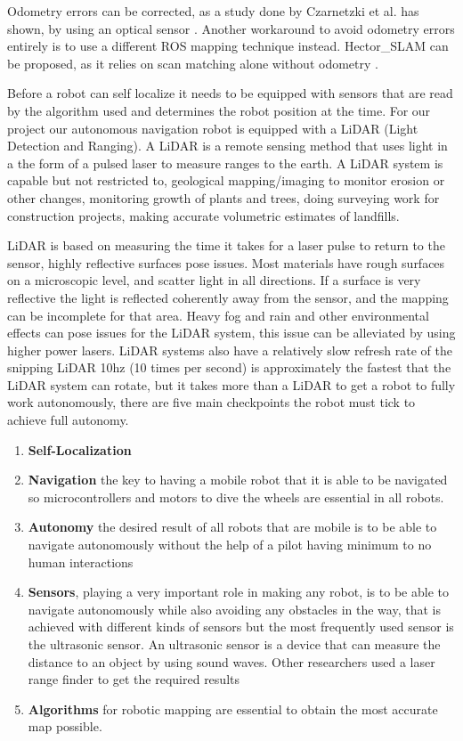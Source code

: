 \documentclass[12pt]{report}
\begin{document}
\vspace{1em}
Odometry errors can be corrected, as a study done by Czarnetzki et al. has shown, by using an optical sensor \cite{Czarnetzki}. Another workaround to avoid odometry errors entirely is to use a different ROS mapping technique instead. Hector\_SLAM can be proposed, as it relies on scan matching alone without odometry \cite{Kamarudin}.\par
\vspace{1em}
Before a robot can self localize it needs to be equipped with sensors that are read by the algorithm used and determines the robot position at the time. For our project our autonomous navigation robot is equipped with a LiDAR (Light Detection and Ranging). A LiDAR is a remote sensing method that uses light in a the form of a pulsed laser to measure ranges to the earth. A LiDAR system is capable but not restricted to, geological mapping/imaging to monitor erosion or other changes, monitoring growth of plants and trees, doing surveying work for construction projects, making accurate volumetric estimates of landfills.\par
\vspace{1em}
LiDAR is based on measuring the time it takes for a laser pulse to return to the sensor, highly reflective surfaces pose issues. Most materials have rough surfaces on a microscopic level, and scatter light in all directions. If a surface is very reflective the light is reflected coherently away from the sensor, and the mapping can be incomplete for that area. Heavy fog and rain and other environmental effects can pose issues for the LiDAR system, this issue can be alleviated by using higher power lasers. LiDAR systems  also have a relatively slow refresh rate of the snipping LiDAR 10hz (10 times per second) is approximately the fastest that the LiDAR system can rotate, but it takes more than a LiDAR to get a robot to fully work autonomously, there are five main checkpoints the robot must tick to achieve full autonomy.\par
\begin{enumerate}
    \item \textbf{Self-Localization}
    \item \textbf{Navigation} the key to having a mobile robot that it is able to be navigated so microcontrollers and motors to dive the wheels are essential in all robots. 
    \item \textbf{Autonomy} the desired result of all robots that are mobile is to be able to navigate autonomously without the help of a pilot having minimum to no human interactions
    \item \textbf{Sensors}, playing a very important role in making any robot, is to be able to navigate autonomously while also avoiding any obstacles in the way, that is achieved with different kinds of sensors but the most frequently used sensor is the ultrasonic sensor. An ultrasonic sensor is a device that can measure the distance to an object by using sound waves.  Other researchers used a laser range finder to get the required results
    \item \textbf{Algorithms} for robotic mapping are essential to obtain the most accurate map possible. 
\end{enumerate}
\end{document}
